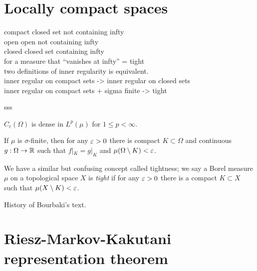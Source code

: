 \documentclass{../../large}
\begin{document}
\section{Locally compact spaces}


compact  closed set not containing infty\\
open     open not containing infty\\
closed   closed set containing infty\\

for a measure that ``vanishes at infty'' = tight\\
two definitions of inner regularity is equivalent.\\

inner regular on compact sets -> inner regular on closed sets\\
inner regular on compact sets + sigma finite -> tight\\

\begin{prb}
\end{prb}

\begin{prb}
sss
\begin{parts}
\item $C_c(\Omega)$ is dense in $L^p(\mu)$ for $1\le p<\infty$.
\item If $\mu$ is $\sigma$-finite, then for any $\varepsilon>0$ there is compact $K\subset\Omega$ and continuous $g:\Omega\to\mathbb{R}$ such that $f|_K=g|_K$ and $\mu(\Omega\setminus K)<\varepsilon$.
\end{parts}
\end{prb}


\begin{prb}
We have a similar but confusing concept called tightness; we say a Borel measure $\mu$ on a topological space $X$ is \emph{tight} if for any $\varepsilon>0$ there is a compact $K\subset X$ such that $\mu(X\setminus K)<\varepsilon$.

History of Bourbaki's text.
\begin{parts}
\item
\end{parts}
\end{prb}





\section{Riesz-Markov-Kakutani representation theorem}
\end{document}
